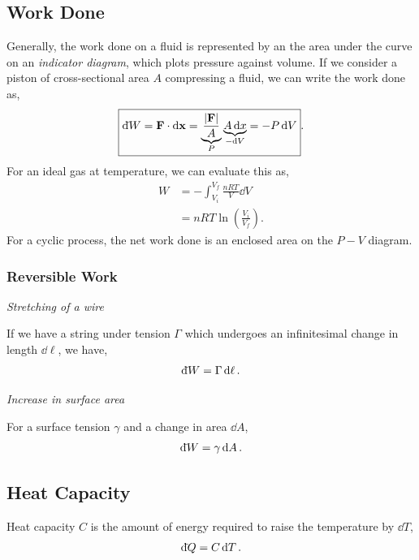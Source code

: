 \documentclass{book}
\newcommand{\dbar}{\mathrm{d}\hspace*{-0.08em}\bar{}\hspace*{0.1em}}
\begin{document}
\subsection{Work Done}
Generally, the work done on a fluid is represented by an the area under the curve on an \textit{indicator diagram}, which plots pressure against volume. If we consider a piston of cross-sectional area $A$ compressing a fluid, we can write the work done as,
\begin{equation}
	\boxed{\dbar W = \vb{F}\cdot\dd{\vb{x}} = \underbrace{\frac{|\vb{F}|}{A}}_P \underbrace{A\dd{x}}_{-\dd{V}} = -P\dd{V}}. \label{eq:work}
\end{equation}
For an ideal gas at temperature, we can evaluate this as,
\begin{equation}
	\begin{split}
	W & = -\int_{V_i}^{V_f} \frac{nRT}{V}\dd{V} \\
	& = nRT\ln\left(\frac{V_i}{V_f}\right).
	\end{split}
\end{equation}
For a cyclic process, the net work done is an enclosed area on the $P-V$ diagram.
\subsubsection{Reversible Work}
\begin{center}\textit{Stretching of a wire}\end{center}
If we have a string under tension $\Gamma$ which undergoes an infinitesimal change in length $\dd{\ell}$, we have,
\begin{equation}
	\dbar W = \Gamma \dd{\ell}.
\end{equation}
\begin{center}\textit{Increase in surface area}\end{center}
For a surface tension $\gamma$ and a change in area $\dd{A}$,
\begin{equation}
	\dbar W = \gamma \dd{A}.
\end{equation}
\subsection{Heat Capacity}
Heat capacity $C$ is the amount of energy required to raise the temperature by $\dd{T}$,
\begin{equation}
	\dbar Q = C\dd{T}.
\end{equation}
\end{document}
